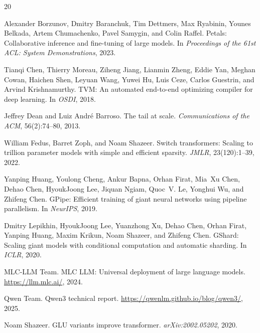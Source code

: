 \documentclass[11pt,a4paper]{article}
\begin{document}
\begin{thebibliography}{20}

Alexander Borzunov, Dmitry Baranchuk, Tim Dettmers, Max Ryabinin,
Younes Belkada, Artem Chumachenko, Pavel Samygin, and Colin Raffel.
\newblock Petals: Collaborative inference and fine-tuning of large
  models.
\newblock In \emph{Proceedings of the 61st ACL: System Demonstrations},
  2023.

Tianqi Chen, Thierry Moreau, Ziheng Jiang, Lianmin Zheng, Eddie Yan,
Meghan Cowan, Haichen Shen, Leyuan Wang, Yuwei Hu, Luis Ceze, Carlos
Guestrin, and Arvind Krishnamurthy.
\newblock TVM: An automated end-to-end optimizing compiler for deep
  learning.
\newblock In \emph{OSDI}, 2018.

Jeffrey Dean and Luiz Andr{\'e} Barroso.
\newblock The tail at scale.
\newblock \emph{Communications of the ACM}, 56(2):74--80, 2013.

William Fedus, Barret Zoph, and Noam Shazeer.
\newblock Switch transformers: Scaling to trillion parameter models with
  simple and efficient sparsity.
\newblock \emph{JMLR}, 23(120):1--39, 2022.

Yanping Huang, Youlong Cheng, Ankur Bapna, Orhan Firat, Mia~Xu Chen,
Dehao Chen, HyoukJoong Lee, Jiquan Ngiam, Quoc~V. Le, Yonghui Wu, and
Zhifeng Chen.
\newblock GPipe: Efficient training of giant neural networks using
  pipeline parallelism.
\newblock In \emph{NeurIPS}, 2019.

Dmitry Lepikhin, HyoukJoong Lee, Yuanzhong Xu, Dehao Chen, Orhan
Firat, Yanping Huang, Maxim Krikun, Noam Shazeer, and Zhifeng Chen.
\newblock GShard: Scaling giant models with conditional computation and
  automatic sharding.
\newblock In \emph{ICLR}, 2020.

{MLC-LLM Team}.
\newblock MLC LLM: Universal deployment of large language models.
\newblock \url{https://llm.mlc.ai/}, 2024.

{Qwen Team}.
\newblock Qwen3 technical report.
\newblock \url{https://qwenlm.github.io/blog/qwen3/}, 2025.

Noam Shazeer.
\newblock GLU variants improve transformer.
\newblock \emph{arXiv:2002.05202}, 2020.


\end{thebibliography}
\end{document}
